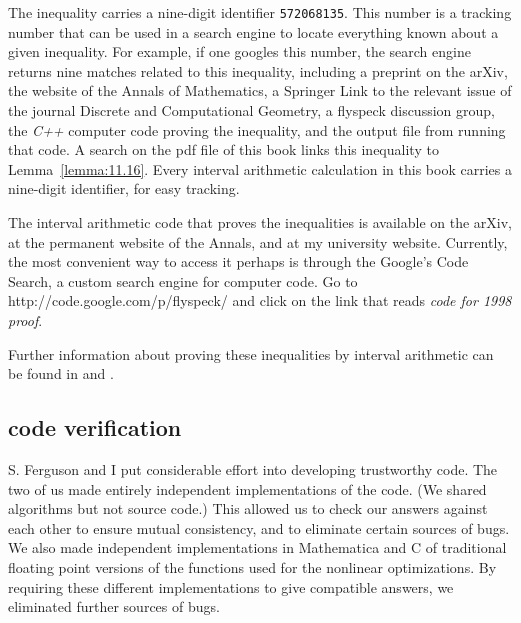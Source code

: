 The inequality carries a nine-digit identifier {\tt 572068135}.    This number
is a tracking number that can be used in a search engine to locate everything known
about a given inequality.
For example,
if one googles this number, the search engine returns 
nine matches related to this inequality, including
a preprint on the arXiv, the website of the Annals of Mathematics, a Springer Link
to the relevant issue of the journal Discrete and Computational Geometry, a flyspeck
discussion group, the {\it C++} computer code proving the inequality, and the output
file from running that code.  A search on the pdf file of this book links this inequality to
Lemma~\ref{lemma:11.16}.  Every interval arithmetic calculation in this book carries
a nine-digit identifier, for easy tracking.

The interval arithmetic code that proves the inequalities is available on the arXiv,
at the permanent website of the Annals, and at my university website.  
Currently, the most convenient
way to access it perhaps is through the Google's Code Search, 
a custom search engine for computer code.
Go to http://code.google.com/p/flyspeck/ and click on the link that reads
{\it code for 1998 proof}.  


Further information about proving these inequalities by interval arithmetic can
be found in \cite{algorithm} and
\cite{part1}. 

\subsection{code verification}

S. Ferguson and I put considerable effort into developing trustworthy
code.  The two of us made entirely independent implementations of
the code. %
(We shared algorithms
but not source code.)  This allowed us to check our answers against each
other to ensure mutual consistency, 
and to eliminate certain sources of bugs.  We also made independent
implementations in Mathematica and C of traditional floating point
versions of the functions used for the nonlinear
optimizations.  By requiring these different implementations to give
compatible answers, we eliminated further sources of bugs.

